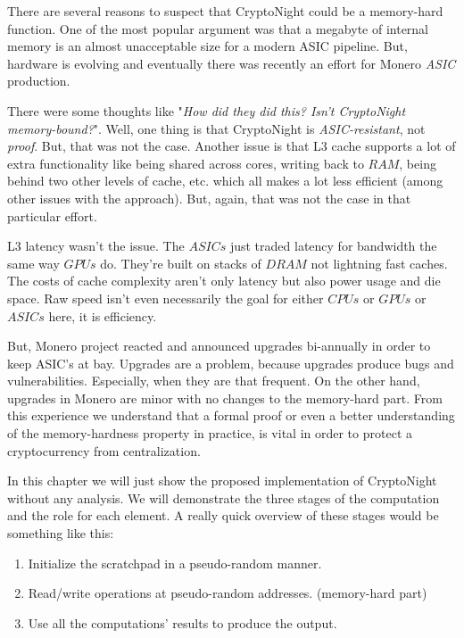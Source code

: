 There are several reasons to suspect that CryptoNight could be a memory-hard function. One of the most popular argument was that a megabyte of internal memory is an almost unacceptable size for a modern ASIC pipeline. But, hardware is evolving and eventually there was recently an effort for Monero \emph{ASIC} production.

There were some thoughts like "\emph{How did they did this? Isn't CryptoNight memory-bound?}". Well, one thing is that CryptoNight is \emph{ASIC-resistant}, not \emph{proof}. But, that was not the case. Another issue is that L3 cache supports a lot of extra functionality like being shared across cores, writing back to $RAM$, being behind two other levels of cache, etc. which all makes a lot less efficient (among other issues with the approach). But, again, that was not the case in that particular effort.

L3 latency wasn't the issue. The $ASICs$ just traded latency for bandwidth the same way $GPUs$ do. They're built on stacks of $DRAM$ not lightning fast caches. The costs of cache complexity aren't only latency but also power usage and die space. Raw speed isn't even necessarily the goal for either $CPUs$ or $GPUs$ or $ASICs$ here, it is efficiency.

But, Monero project reacted and announced upgrades bi-annually in order to keep ASIC's at bay. Upgrades are a problem, because upgrades produce bugs and vulnerabilities. Especially, when they are that frequent. On the other hand, upgrades in Monero are minor with no changes to the memory-hard part. From this experience we understand that a formal proof or even a better understanding of the memory-hardness property in practice, is vital in order to protect a cryptocurrency from centralization.

In this chapter we will just show the proposed implementation of CryptoNight without any analysis. We will demonstrate the three stages of the computation and the role for each element. A really quick overview of these stages would be something like this:

\begin{enumerate}
  \item Initialize the scratchpad in a pseudo-random manner.
  \item Read/write operations at pseudo-random addresses. (memory-hard part)
  \item Use all the computations' results to produce the output.
\end{enumerate}

